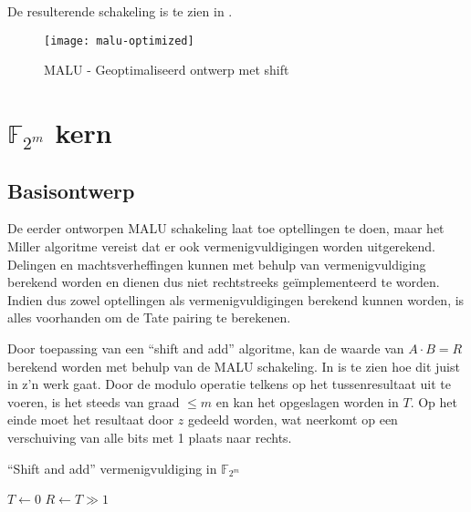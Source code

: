 De resulterende schakeling is te zien in .

\begin{figure}[h]
	\centering
		\texttt{[image: malu-optimized]}
		\caption{MALU - Geoptimaliseerd ontwerp met shift\label{figuur-implementatie-malu-optimized}}
\end{figure}

\section{$\mathbb{F}_{2^m}$\label{sectie-implementatie-gf2m} kern}

\subsection{Basisontwerp\label{subsectie-implementatie-gf2m-basisontwerp}}

De eerder ontworpen MALU schakeling laat toe optellingen te doen, maar het Miller algoritme vereist dat er ook vermenigvuldigingen worden uitgerekend. Delingen en machtsverheffingen kunnen met behulp van vermenigvuldiging berekend worden en dienen dus niet rechtstreeks ge\"implementeerd te worden. Indien dus zowel optellingen als vermenigvuldigingen berekend kunnen worden, is alles voorhanden om de Tate pairing te berekenen.

Door toepassing van een ``shift and add'' algoritme, kan de waarde van \mbox{$A \cdot B = R$} berekend worden met behulp van de MALU schakeling. In  is te zien hoe dit juist in z'n werk gaat. Door de modulo operatie telkens op het tussenresultaat uit te voeren, is het steeds van graad $\leq m$ en kan het opgeslagen worden in $T$. Op het einde moet het resultaat door $z$ gedeeld worden, wat neerkomt op een verschuiving van alle bits met 1 plaats naar rechts.

\begin{algorithm}[h]
	\caption{``Shift and add'' vermenigvuldiging in $\mathbb{F}_{2^m}$}
	\label{algoritme-implementatie-gf2m-multiply}

	$T \leftarrow 0$\;
	$R \leftarrow T \gg 1$\;
\end{algorithm}

